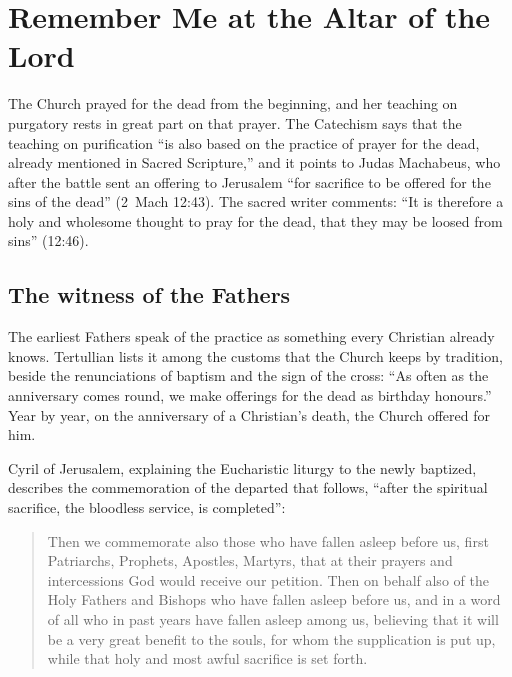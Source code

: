 \section{Remember Me at the Altar of the Lord}\label{sec:suffrage}

The Church prayed for the dead from the beginning, and her teaching on purgatory rests in great part on that prayer. The Catechism says that the teaching on purification ``is also based on the practice of prayer for the dead, already mentioned in Sacred Scripture,'' and it points to Judas Machabeus, who after the battle sent an offering to Jerusalem ``for sacrifice to be offered for the sins of the dead'' (2~Mach 12:43). The sacred writer comments: ``It is therefore a holy and wholesome thought to pray for the dead, that they may be loosed from sins'' (12:46).

\subsection{The witness of the Fathers}

The earliest Fathers speak of the practice as something every Christian already knows. Tertullian lists it among the customs that the Church keeps by tradition, beside the renunciations of baptism and the sign of the cross: ``As often as the anniversary comes round, we make offerings for the dead as birthday honours.'' Year by year, on the anniversary of a Christian's death, the Church offered for him.

Cyril of Jerusalem, explaining the Eucharistic liturgy to the newly baptized, describes the commemoration of the departed that follows, ``after the spiritual sacrifice, the bloodless service, is completed'':

\begin{quote}
Then we commemorate also those who have fallen asleep before us, first Patriarchs, Prophets, Apostles, Martyrs, that at their prayers and intercessions God would receive our petition. Then on behalf also of the Holy Fathers and Bishops who have fallen asleep before us, and in a word of all who in past years have fallen asleep among us, believing that it will be a very great benefit to the souls, for whom the supplication is put up, while that holy and most awful sacrifice is set forth.
\end{quote}

